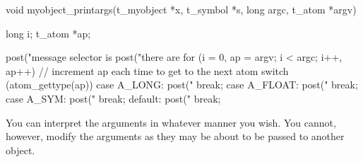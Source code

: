 \begin{DoxyCode}
    void myobject_printargs(t_myobject *x, t_symbol *s, long argc, t_atom *argv)
    {
        long i;
        t_atom *ap;

        post("message selector is %
        post("there are %
        for (i = 0, ap = argv; i < argc; i++, ap++) {       // increment ap each 
      time to get to the next atom
            switch (atom_gettype(ap)) {
                case A_LONG:
                    post("%
                    break;
                case A_FLOAT:
                    post("%
                    break;
                case A_SYM:
                    post("%
                    break;
                default:
                    post("%
                    break;
            }
        }
    }
\end{DoxyCode}


You can interpret the arguments in whatever manner you wish. You cannot, however, modify the arguments as they may be about to be passed to another object. 